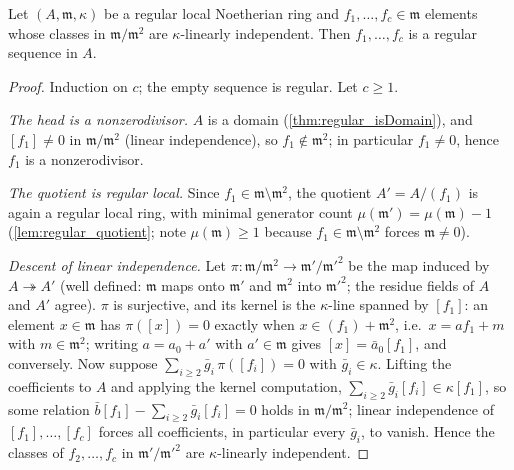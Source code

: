 \begin{theorem}
  \label{thm:matsumura_regular_sequence}
  \leanok
  Let \((A, \mathfrak m, \kappa)\) be a regular local Noetherian ring and
  \(f_1, \dots, f_c \in \mathfrak m\) elements whose classes in
  \(\mathfrak m/\mathfrak m^2\) are \(\kappa\)-linearly independent. Then
  \(f_1, \dots, f_c\) is a regular sequence in \(A\).
\end{theorem}
\begin{proof}
  \leanok
  Induction on \(c\); the empty sequence is regular. Let \(c \geq 1\).

  \emph{The head is a nonzerodivisor.} \(A\) is a domain
  (\ref{thm:regular_isDomain}), and \([f_1] \neq 0\) in
  \(\mathfrak m/\mathfrak m^2\) (linear independence), so
  \(f_1 \notin \mathfrak m^2\); in particular \(f_1 \neq 0\), hence \(f_1\) is
  a nonzerodivisor.

  \emph{The quotient is regular local.} Since
  \(f_1 \in \mathfrak m \setminus \mathfrak m^2\), the quotient
  \(A' = A/(f_1)\) is again a regular local ring, with minimal generator count
  \(\mu(\mathfrak m') = \mu(\mathfrak m) - 1\) (\ref{lem:regular_quotient};
  note \(\mu(\mathfrak m) \geq 1\) because \(f_1 \in \mathfrak m \setminus
  \mathfrak m^2\) forces \(\mathfrak m \neq 0\)).

  \emph{Descent of linear independence.} Let \(\pi : \mathfrak m/\mathfrak m^2
  \to \mathfrak m'/\mathfrak m'^2\) be the map induced by \(A \twoheadrightarrow
  A'\) (well defined: \(\mathfrak m\) maps onto \(\mathfrak m'\) and
  \(\mathfrak m^2\) into \(\mathfrak m'^2\); the residue fields of \(A\) and
  \(A'\) agree). \(\pi\) is surjective, and its kernel is the \(\kappa\)-line
  spanned by \([f_1]\): an element \(x \in \mathfrak m\) has
  \(\pi([x]) = 0\) exactly when \(x \in (f_1) + \mathfrak m^2\), i.e.\
  \(x = a f_1 + m\) with \(m \in \mathfrak m^2\); writing \(a = a_0 + a'\) with
  \(a' \in \mathfrak m\) gives \([x] = \bar a_0 [f_1]\), and conversely.
  Now suppose \(\sum_{i \geq 2} \bar g_i\, \pi([f_i]) = 0\) with
  \(\bar g_i \in \kappa\). Lifting the coefficients to \(A\) and applying the
  kernel computation, \(\sum_{i \geq 2} \bar g_i [f_i] \in \kappa [f_1]\), so
  some relation \(\bar b [f_1] - \sum_{i \geq 2} \bar g_i [f_i] = 0\) holds in
  \(\mathfrak m / \mathfrak m^2\); linear independence of
  \([f_1], \dots, [f_c]\) forces all coefficients, in particular every
  \(\bar g_i\), to vanish. Hence the classes of \(f_2, \dots, f_c\) in
  \(\mathfrak m'/\mathfrak m'^2\) are \(\kappa\)-linearly independent.


\end{proof}
